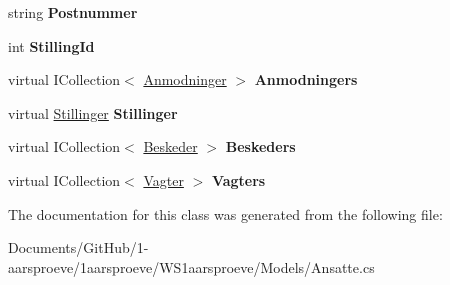 \begin{DoxyCompactItemize}
\item 
\hypertarget{class_w_s1aarsproeve_1_1_ansatte_a205fd244d9e5f8dad555c4719e850eeb}{}string {\bfseries Postnummer}\label{class_w_s1aarsproeve_1_1_ansatte_a205fd244d9e5f8dad555c4719e850eeb}

\item 
\hypertarget{class_w_s1aarsproeve_1_1_ansatte_a14cb42b82f9aed30d90560db003c36d9}{}int {\bfseries Stilling\+Id}\label{class_w_s1aarsproeve_1_1_ansatte_a14cb42b82f9aed30d90560db003c36d9}

\item 
\hypertarget{class_w_s1aarsproeve_1_1_ansatte_ab296a881eea7a397c6d884c3aeac3277}{}virtual I\+Collection$<$ \hyperlink{class_w_s1aarsproeve_1_1_anmodninger}{Anmodninger} $>$ {\bfseries Anmodningers}\label{class_w_s1aarsproeve_1_1_ansatte_ab296a881eea7a397c6d884c3aeac3277}

\item 
\hypertarget{class_w_s1aarsproeve_1_1_ansatte_a9aab54458a75700f9f2d8a1153f21d6e}{}virtual \hyperlink{class_w_s1aarsproeve_1_1_stillinger}{Stillinger} {\bfseries Stillinger}\label{class_w_s1aarsproeve_1_1_ansatte_a9aab54458a75700f9f2d8a1153f21d6e}

\item 
\hypertarget{class_w_s1aarsproeve_1_1_ansatte_a8bfae47fc31de8cdb80d5a9e2ee13e39}{}virtual I\+Collection$<$ \hyperlink{class_w_s1aarsproeve_1_1_beskeder}{Beskeder} $>$ {\bfseries Beskeders}\label{class_w_s1aarsproeve_1_1_ansatte_a8bfae47fc31de8cdb80d5a9e2ee13e39}

\item 
\hypertarget{class_w_s1aarsproeve_1_1_ansatte_aac27c59f47c1fe2e694c33691bce0d39}{}virtual I\+Collection$<$ \hyperlink{class_w_s1aarsproeve_1_1_vagter}{Vagter} $>$ {\bfseries Vagters}\label{class_w_s1aarsproeve_1_1_ansatte_aac27c59f47c1fe2e694c33691bce0d39}

\end{DoxyCompactItemize}


The documentation for this class was generated from the following file\+:\begin{DoxyCompactItemize}
\item 
Documents/\+Git\+Hub/1-\/aarsproeve/1aarsproeve/\+W\+S1aarsproeve/\+Models/Ansatte.\+cs\end{DoxyCompactItemize}

